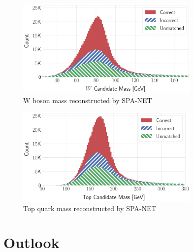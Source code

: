 \begin{figure}[H]
	\centering
	\includegraphics[width=0.8\textwidth]{Figures/network_w_quark_stacked.pdf}
	\caption{W boson mass reconstructed by SPA-NET}
	\label{fig: spanet reco Wboson}
\end{figure}
\begin{figure}[H]
	\centering
	\includegraphics[width=0.8\textwidth]{Figures/network_t_quark_stacked.pdf}
	\caption{ Top quark mass reconstructed by SPA-NET}
	\label{fig: spanet reco t quark}
\end{figure}

\section{Outlook}\label{sec:outlook}



